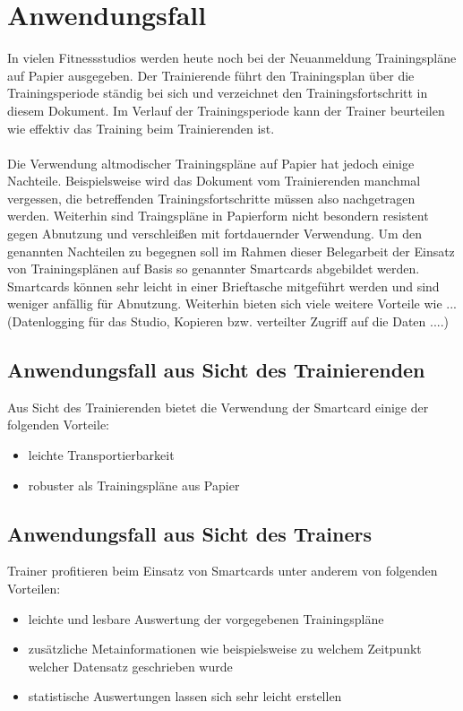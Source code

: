 \documentclass[a4paper,12pt]{scrartcl}
\begin{document}

\clearpage
\section{Anwendungsfall}
\label{sec:1}
In vielen Fitnessstudios werden heute noch bei der Neuanmeldung Trainingspläne auf Papier ausgegeben. Der Trainierende führt den Trainingsplan über die Trainingsperiode ständig bei sich und verzeichnet den Trainingsfortschritt in diesem Dokument.
Im Verlauf der Trainingsperiode kann der Trainer beurteilen wie effektiv das Training beim Trainierenden ist.\\
\\
Die Verwendung altmodischer Trainingspläne auf Papier hat jedoch einige Nachteile. Beispielsweise wird das Dokument vom Trainierenden manchmal vergessen, die betreffenden Trainingsfortschritte müssen also nachgetragen werden. 
Weiterhin sind Traingspläne in Papierform nicht besondern resistent gegen Abnutzung und verschleißen mit fortdauernder Verwendung. Um den genannten Nachteilen zu begegnen soll im Rahmen dieser Belegarbeit der Einsatz von Trainingsplänen
auf Basis so genannter Smartcards abgebildet werden. Smartcards können sehr leicht in einer Brieftasche mitgeführt werden und sind weniger anfällig für Abnutzung. Weiterhin bieten sich viele weitere Vorteile wie ... (Datenlogging für das Studio, Kopieren bzw. 
verteilter Zugriff auf die Daten ....) 


\subsection{Anwendungsfall aus Sicht des Trainierenden}
\label{subsec:1.1}

Aus Sicht des Trainierenden bietet die Verwendung der Smartcard einige der folgenden Vorteile:
\begin{itemize}
\item leichte Transportierbarkeit
\item robuster als Trainingspläne aus Papier
\end{itemize}


\subsection{Anwendungsfall aus Sicht des Trainers}
\label{subsec:1.2}
Trainer profitieren beim Einsatz von Smartcards unter anderem von folgenden Vorteilen:
\begin{itemize}
\item leichte und lesbare Auswertung der vorgegebenen Trainingspläne
\item zusätzliche Metainformationen wie beispielsweise zu welchem Zeitpunkt welcher Datensatz geschrieben wurde
\item statistische Auswertungen lassen sich sehr leicht erstellen 
\end{itemize}
\end{document}
